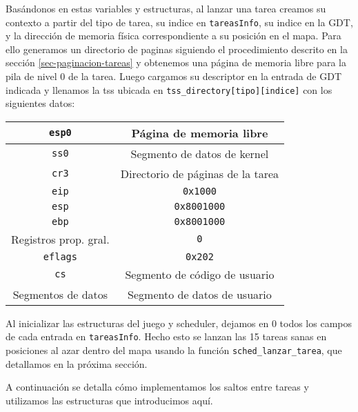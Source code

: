 \label{subsec:tss-lanzar}
Basándonos en estas variables y estructuras, al lanzar una tarea creamos su contexto a partir del tipo de tarea, su indice en \verb|tareasInfo|, su indice en la GDT, y la dirección de memoria física correspondiente a su posición en el mapa. 
Para ello generamos un directorio de paginas siguiendo el procedimiento descrito en la sección \ref{sec-paginacion-tareas} y obtenemos una página de memoria libre para la pila de nivel 0 de la tarea. Luego cargamos su descriptor en la entrada de GDT indicada y llenamos la tss ubicada en \verb|tss_directory[tipo][indice]| con los siguientes datos:\\


\begin{center}
	\begin{tabular}{ |c| c | }
		\hline
		\verb|esp0| & Página de memoria libre\\
		\hline
		\verb|ss0|  & Segmento de datos de kernel\\
		\hline
		\verb|cr3|  & Directorio de páginas de la tarea\\
		\hline
		\verb|eip|  & \verb|0x1000|\\
		\hline
		\verb|esp|  & \verb|0x8001000|\\
		\hline
		\verb|ebp|  & \verb|0x8001000|\\
		\hline
		Registros prop. gral. & \verb|0|\\
		\hline
		\verb|eflags| & \verb|0x202|\\
		\hline
		\verb|cs| & Segmento de código de usuario\\
		\hline
		Segmentos de datos & Segmento de datos de usuario\\
		\hline
	\end{tabular}
\end{center}
\vspace{10pt}

\label{sec:tss-tareasInfo-init}
Al inicializar las estructuras del juego y scheduler, dejamos en 0 todos los campos de cada entrada en \verb|tareasInfo|. 
Hecho esto se lanzan las 15 tareas sanas en posiciones al azar dentro del mapa usando la función \verb|sched_lanzar_tarea|, que detallamos en la próxima sección.

A continuación se detalla cómo implementamos los saltos entre tareas y utilizamos las estructuras que introducimos aquí.






